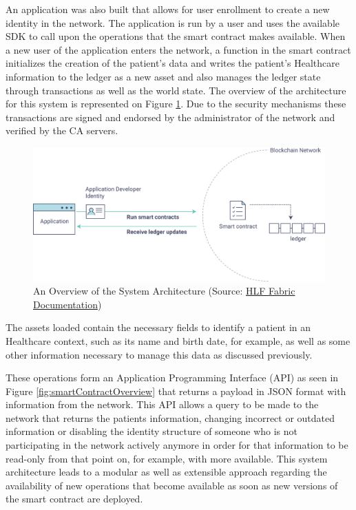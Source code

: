An application was also built that allows for user enrollment to create a new
identity in the network. The application is run by a user and uses the
available SDK to call upon the operations that the smart contract makes
available. When a new user of the application enters the network, a function in
the smart contract initializes the creation of the patient's data and writes
the patient's Healthcare information to the ledger as a new asset and also
manages the ledger state through transactions as well as the world state.  The
overview of the architecture for this system is represented on Figure
\ref{fig:appOverview}. Due to the security mechanisms these transactions are
signed and endorsed by the administrator of the network and verified by the CA
servers.

\begin{figure}[ht] \centering
  \includegraphics[width=1\linewidth]{imgs/hyperledgerAppOverview.png}
  \caption{\label{fig:appOverview}An Overview of the System Architecture
  (Source:
  \href{http://hyperledger-fabric.readthedocs.io/en/latest/write_first_app.html}{HLF
  Fabric Documentation})} 
\end{figure}

The assets loaded contain the necessary fields to identify a patient in an
Healthcare context, such as its name and birth date, for example, as well as
some other information necessary to manage this data as discussed previously.


These operations form an Application Programming Interface (API) as seen in
Figure \ref{fig:smartContractOverview} that returns a payload in JSON format
with information from the network. This API allows a query to be made to the
network that returns the patients information, changing incorrect or outdated
information or disabling the identity structure of someone who is not
participating in the network actively anymore in order for that information to
be read-only from that point on, for example, with more available. This system
architecture leads to a modular as well as extensible approach regarding the
availability of new operations that become available as soon as new versions of
the smart contract are deployed.  


